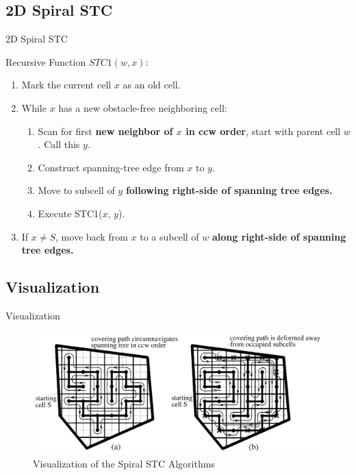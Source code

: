 \documentclass{beamer}
\begin{document}
\subsection{2D Spiral STC}
\begin{frame}{2D Spiral STC}
    \begin{block}{Recursive Function $STC1(w,x)$:}
        \begin{enumerate}
            \item Mark the current cell $x$ as an old cell.
            \item While $x$ has a new obstacle-free neighboring cell:
                  \begin{enumerate}
                      \item Scan for first \textbf{new neighbor of $x$ in ccw order}, start with parent cell $w$. Call this $y$.
                      \item Construct spanning-tree edge from $x$ to $y$.
                      \item Move to subcell of $y$ \textbf{following right-side of spanning tree edges.}
                      \item Execute STC1($x$, $y$).
                  \end{enumerate}
            \item If $x \neq S$, move back from $x$ to a subcell of $w$ \textbf{along right-side of spanning tree edges.}
        \end{enumerate}
    \end{block}
\end{frame}

\subsection{Visualization}
\begin{frame}{Visualization}
    \begin{figure}
        \includegraphics[width=\linewidth]{Images/inv_fig3.png}
        \caption{Visualization of the Spiral STC Algorithms}
    \end{figure}
\end{frame}
\end{document}
